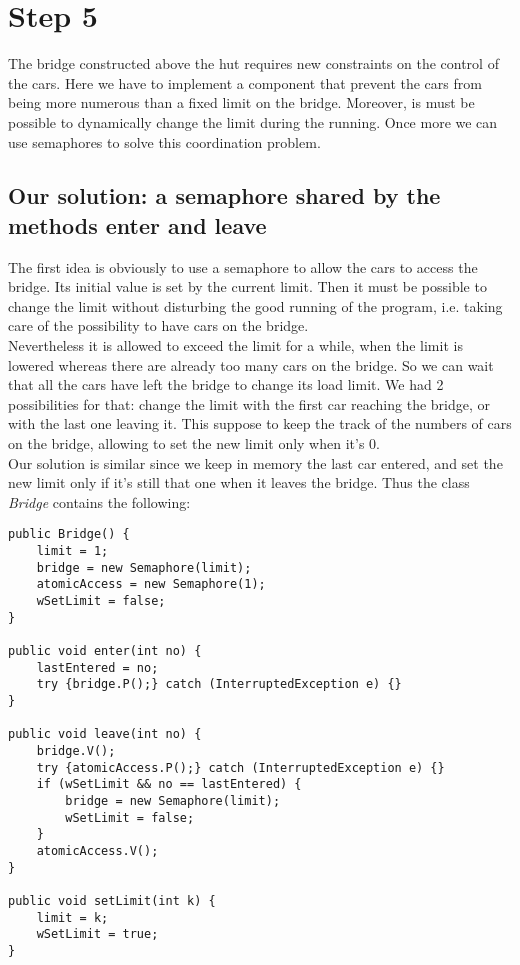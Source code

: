 
\section{Step 5}


The bridge constructed above the hut requires new constraints on the control of the cars. Here we have to implement a component that prevent the cars from being more numerous than a fixed limit on the bridge. Moreover, is must be possible to dynamically change the limit during the running. Once more we can use semaphores to solve this coordination problem.

\subsection{Our solution: a semaphore shared by the methods enter and leave}
The first idea is obviously to use a semaphore to allow the cars to access the bridge. Its initial value is set by the current limit. Then it must be possible to change the limit without disturbing the good running of the program, i.e. taking care of the possibility to have cars on the bridge.\\
Nevertheless it is allowed to exceed the limit for a while, when the limit is lowered whereas there are already too many cars on the bridge. So we can wait that all the cars have left the bridge to change its load limit. We had 2 possibilities for that: change the limit with the first car reaching the bridge, or with the last one leaving it. This suppose to keep the track of the numbers of cars on the bridge, allowing to set the new limit only when it's 0.\\
Our solution is similar since we keep in memory the last car entered, and set the new limit only if it's still that one when it leaves the bridge. Thus the class \textit{Bridge} contains the following:

\begin{verbatim}
public Bridge() {
	limit = 1;
	bridge = new Semaphore(limit);
	atomicAccess = new Semaphore(1);
	wSetLimit = false;
}

public void enter(int no) {
	lastEntered = no;
	try {bridge.P();} catch (InterruptedException e) {}
}

public void leave(int no) {
	bridge.V();
	try {atomicAccess.P();} catch (InterruptedException e) {}
	if (wSetLimit && no == lastEntered) {
		bridge = new Semaphore(limit);
		wSetLimit = false;
	}
	atomicAccess.V();
}

public void setLimit(int k) {
	limit = k;
	wSetLimit = true;
}
\end{verbatim}




